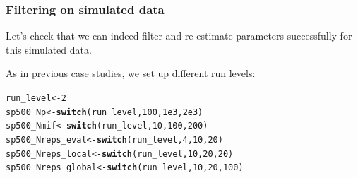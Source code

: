 \documentclass{beamer}\usepackage[]{graphicx}\usepackage[]{color}
\makeatletter
\newcommand{\hlnum}[1]{\textcolor[rgb]{0.686,0.059,0.569}{#1}}%
\newcommand{\hlstd}[1]{\textcolor[rgb]{0.345,0.345,0.345}{#1}}%
\newcommand{\hlkwb}[1]{\textcolor[rgb]{0.69,0.353,0.396}{#1}}%
\newcommand{\hlkwd}[1]{\textcolor[rgb]{0.737,0.353,0.396}{\textbf{#1}}}%
\newenvironment{kframe}{%
 \def\at@end@of@kframe{}%
 \ifinner\ifhmode%
  \def\at@end@of@kframe{\end{minipage}}%
  \begin{minipage}{\columnwidth}%
 \fi\fi%
 \def\FrameCommand##1{\hskip\@totalleftmargin \hskip-\fboxsep
 \colorbox{shadecolor}{##1}\hskip-\fboxsep
     \hskip-\linewidth \hskip-\@totalleftmargin \hskip\columnwidth}%
 \MakeFramed {\advance\hsize-\width
   \@totalleftmargin\z@ \linewidth\hsize
   \@setminipage}}%
 {\par\unskip\endMakeFramed%
 \at@end@of@kframe}
\newenvironment{knitrout}{}{} %
\makeatother
\begin{document}
\begin{frame}[fragile]

\frametitle{Filtering on simulated data}

\bi

\item Let's check that we can indeed filter and re-estimate parameters successfully for this simulated data.  

\item As in previous case studies, we set up different run levels:

\ei

\begin{knitrout}\small
{}\color{fgcolor}\begin{kframe}
\begin{alltt}
\hlstd{run_level} \hlkwb{<-} \hlnum{2}
\hlstd{sp500_Np} \hlkwb{<-}           \hlkwd{switch}\hlstd{(run_level,}\hlnum{100}\hlstd{,}\hlnum{1e3}\hlstd{,}\hlnum{2e3}\hlstd{)}
\hlstd{sp500_Nmif} \hlkwb{<-}         \hlkwd{switch}\hlstd{(run_level,}\hlnum{10}\hlstd{,} \hlnum{100}\hlstd{,}\hlnum{200}\hlstd{)}
\hlstd{sp500_Nreps_eval} \hlkwb{<-}   \hlkwd{switch}\hlstd{(run_level,}\hlnum{4}\hlstd{,}  \hlnum{10}\hlstd{,}  \hlnum{20}\hlstd{)}
\hlstd{sp500_Nreps_local} \hlkwb{<-}  \hlkwd{switch}\hlstd{(run_level,}\hlnum{10}\hlstd{,} \hlnum{20}\hlstd{,} \hlnum{20}\hlstd{)}
\hlstd{sp500_Nreps_global} \hlkwb{<-} \hlkwd{switch}\hlstd{(run_level,}\hlnum{10}\hlstd{,} \hlnum{20}\hlstd{,} \hlnum{100}\hlstd{)}
\end{alltt}
\end{kframe}
\end{knitrout}

\end{frame}
\end{document}
